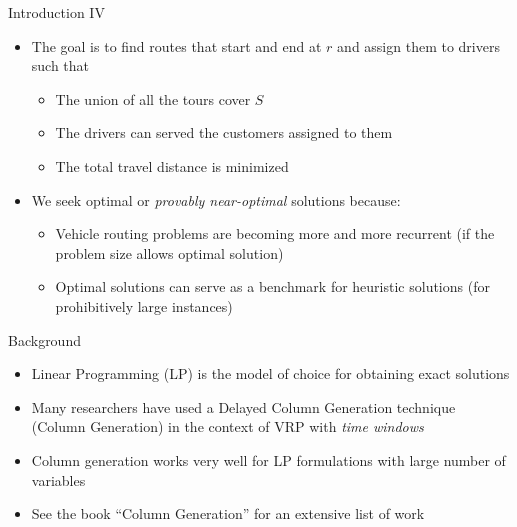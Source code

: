 \documentclass[10pt]{beamer}
\begin{document}
\begin{frame}{Introduction IV}
\begin{itemize}
    \item<1-> The goal is to find routes that start and end at $r$ and assign them to drivers such that
    \begin{itemize}
        \item<2-> The union of all the tours cover $S$
        \item<3-> The drivers can served the customers assigned to them
        \item<4-> The total travel distance is minimized
    \end{itemize}
    \item<5-> We seek optimal or \emph{provably near-optimal } solutions because:
        \begin{itemize}
            \item<6-> Vehicle routing problems are becoming more and more recurrent (if the problem size allows optimal solution)
            \item<7-> Optimal solutions can serve as a benchmark for heuristic solutions (for prohibitively large instances)
        \end{itemize}
\end{itemize}
\end{frame}


\begin{frame}{Background}
\begin{itemize}
    \item<1-> Linear Programming (LP) is the model of choice for obtaining exact solutions
    \item<2-> Many researchers have used a \alert{Delayed Column Generation} technique (Column Generation) in the context of VRP with \emph{time windows}
    \item<3-> Column generation works very well for LP formulations with large number of variables
    \item<4-> See the book ``Column Generation'' \cite{DDS05} for an extensive list of work
\end{itemize}
\end{frame}
\end{document}
